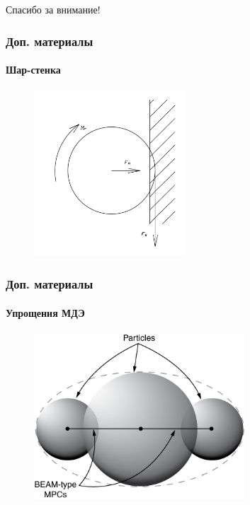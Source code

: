 \documentclass[c]{beamer}  %
\begin{document}
\begin{frame}
\centering
Спасибо за внимание!
\end{frame}


\begin{frame}
\frametitle{Доп. материалы} 
\framesubtitle{Шар-стенка}

\begin{figure}[h!]
	\centering
	\includegraphics[width=0.5\textwidth]{ball_wall}
\end{figure} 
\end{frame}


\begin{frame}
\frametitle{Доп. материалы} 
\framesubtitle{Упрощения МДЭ}

\begin{figure}[h!]
	\centering
	\includegraphics[width=0.7\textwidth]{dem-rigid-cluster}
\end{figure} 
\end{frame}
\end{document}

